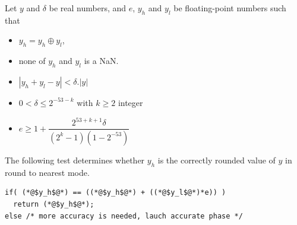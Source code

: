 \begin{theorem}
  Let $y$ and $\delta$ be real numbers, and $e$, $y_h$ and $y_l$ be
  floating-point numbers such that 
  \begin{itemize}
  \item $y_h=y_h\oplus y_l$,
  \item none of $y_h$ and $y_l$ is a  NaN.
  \item $|y_h+y_l - y| < \delta.|y|$
  \item $0< \delta \le 2^{-53-k}$ with $k\ge 2$ integer
  \item $e\ge 1+  \dfrac{2^{53+k+1}\delta}{(2^{k}-1)(1-2^{-53})}$
\end{itemize}

The following test determines whether $y_h$ is the
  correctly rounded value of $y$ in  round to nearest mode.

\begin{lstlisting}[label={roundingtonearest},
  caption={Test for correct rounding to nearest},
  firstnumber=1]
if( (*@$y_h$@*) == ((*@$y_h$@*) + ((*@$y_l$@*)*e)) )
  return (*@$y_h$@*);
else /* more accuracy is needed, lauch accurate phase */
\end{lstlisting}
\end{theorem}

